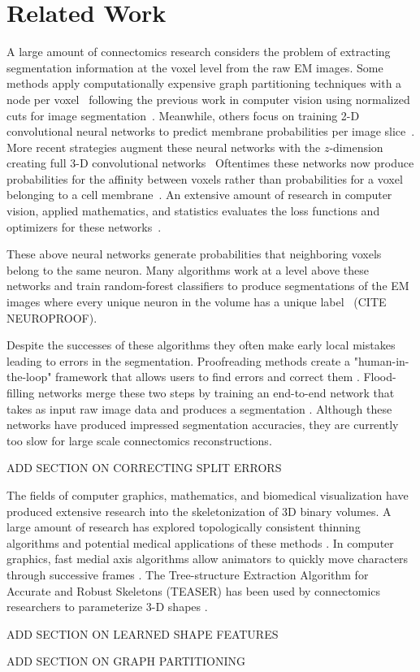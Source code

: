 \section{Related Work}

A large amount of connectomics research considers the problem of extracting segmentation information at the voxel level from the raw EM images. 
Some methods apply computationally expensive graph partitioning techniques with a node per voxel~\cite{andres2012globally} following the previous work in computer vision using normalized cuts for image segmentation~\cite{kappes2016higher,shi2000normalized,tatiraju2008image}. 
Meanwhile, others focus on training 2-D convolutional neural networks to predict membrane probabilities per image slice~\cite{ciresan2012deep}. 
More recent strategies augment these neural networks with the $z$-dimension creating full 3-D convolutional networks~\cite{lee2015recursive}
Oftentimes these networks now produce probabilities for the affinity between voxels rather than probabilities for a voxel belonging to a cell membrane~\cite{ronneberger2015u}. 
An extensive amount of research in computer vision, applied mathematics, and statistics evaluates the loss functions and optimizers for these networks~\cite{chatfield2014return,maas2013rectifier,nesterov1983method}.

These above neural networks generate probabilities that neighboring voxels belong to the same neuron.
Many algorithms work at a level above these networks and train random-forest classifiers to produce segmentations of the EM images where every unique neuron in the volume has a unique label~\cite{seymour2016rhoananet,nunez2014graph,parag2017anisotropic,zlateski2015image} (CITE NEUROPROOF). 



Despite the successes of these algorithms they often make early local mistakes leading to errors in the segmentation. Proofreading methods create a "human-in-the-loop" framework that allows users to find errors and correct them \cite{haehn2017scalable,haehn2017guided,haehn2014design}. Flood-filling networks merge these two steps by training an end-to-end network that takes as input raw image data and produces a segmentation \cite{januszewski2016flood}. Although these networks have produced impressed segmentation accuracies, they are currently too slow for large scale connectomics reconstructions. 

ADD SECTION ON CORRECTING SPLIT ERRORS

The fields of computer graphics, mathematics, and biomedical visualization have produced extensive research into the skeletonization of 3D binary volumes. A large amount of research has explored topologically consistent thinning algorithms and potential medical applications of these methods \cite{palagyi20003d,palagyi2001sequential}. In computer graphics, fast medial axis algorithms allow animators to quickly move characters through successive frames \cite{baran2007automatic,bharaj2012automatically}. The Tree-structure Extraction Algorithm for Accurate and Robust Skeletons (TEASER) has been used by connectomics researchers to parameterize 3-D shapes \cite{sato2000teasar,zhao2014automatic}. 

ADD SECTION ON LEARNED SHAPE FEATURES

ADD SECTION ON GRAPH PARTITIONING
